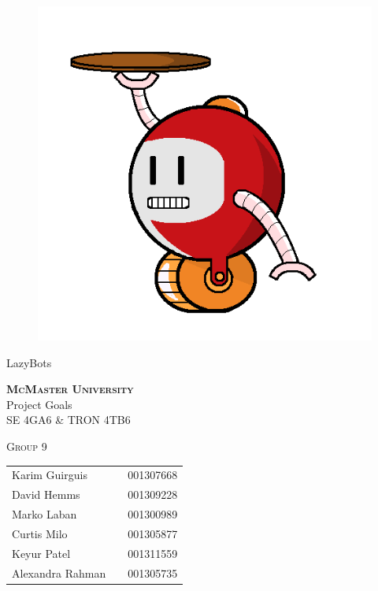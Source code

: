 \documentclass [11pt]{article}
\begin{document}
\begin {center} 

\thispagestyle{empty}
\vspace*{5cm}

\begin {figure}[h!]
\centering
\hspace{-10mm}\includegraphics [scale = .3, trim={.4cm 0 .8cm 0},clip] {figures/alfred.png}
\end {figure}

{\fontfamily{\cabinfamily}\selectfont
\Huge{LazyBots} }

\vspace{1 cm}
{\Large\textbf{\textsc{McMaster University}}\\}  \vspace {1cm}
{\Large Project Goals\\ \vspace {0.4 cm} SE 4GA6 \& TRON 4TB6}  \vspace {1cm}

{\large \textsc{Group 9} \\} \vspace{1cm}

\begin{tabular}{ l c  l}
Karim Guirguis & & 001307668 \\
David Hemms & & 001309228 \\
Marko Laban & & 001300989 \\
Curtis Milo & & 001305877 \\
Keyur Patel & & 001311559 \\
Alexandra Rahman & & 001305735
\end{tabular}

\end{center}
\end{document}
